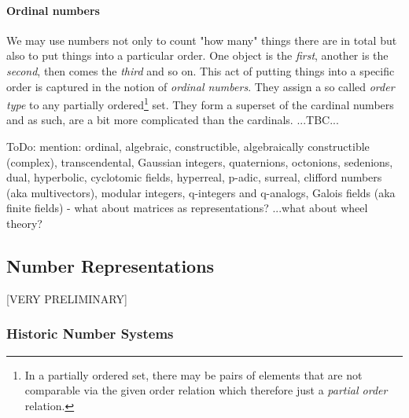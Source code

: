 \paragraph{Ordinal numbers} 
We may use numbers not only to count "how many" things there are in total but also to put things into a particular order. One object is the \emph{first}, another is the \emph{second}, then comes the \emph{third} and so on. This act of putting things into a specific order is captured in the notion of \emph{ordinal numbers}. They assign a so called \emph{order type} to any partially ordered\footnote{In a partially ordered set, there may be pairs of elements that are not comparable via the given order relation which therefore just a \emph{partial order} relation.} set. They form a superset of the cardinal numbers and as such, are a bit more complicated than the cardinals. ...TBC...

\medskip
ToDo: mention: ordinal, algebraic, constructible, algebraically constructible (complex), transcendental, Gaussian integers, quaternions, octonions, sedenions, dual, hyperbolic, cyclotomic fields, hyperreal, p-adic, surreal, clifford numbers (aka multivectors),  modular integers, q-integers and q-analogs, Galois fields (aka finite fields) - what about matrices as representations? ...what about wheel theory?






\subsection{Number Representations} [VERY PRELIMINARY]

\subsubsection{Historic Number Systems}

